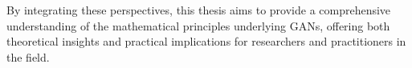 By integrating these perspectives, this thesis aims to provide a comprehensive understanding of the mathematical principles underlying GANs, offering both theoretical insights and practical implications for researchers and practitioners in the field.



